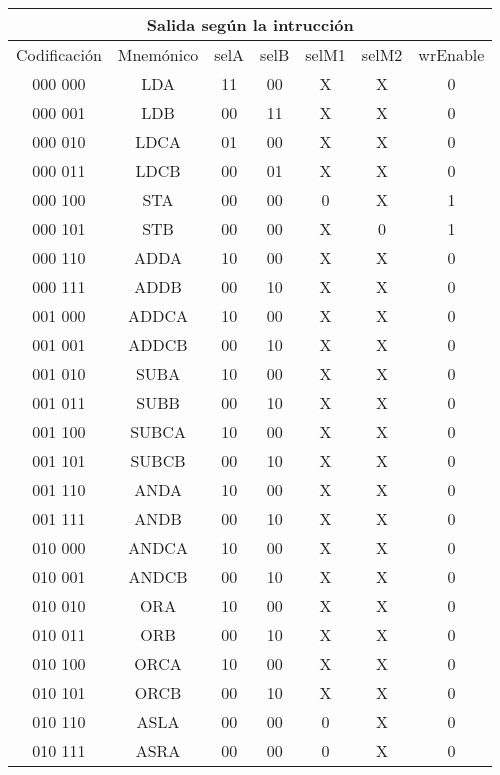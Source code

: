 \documentclass[paper=letter, fontsize=12pt]{article}
\begin{document}
\begin{table}[h]
\centering
\begin{tabular}{cc|ccccc}
\multicolumn{7}{c}{Salida según la intrucción} \\ \hline
Codificación& Mnemónico	  	& selA & selB & selM1 & selM2 & wrEnable \\ \hline
000 000 	& LDA 		  	& 11 	& 00    & X     & X     & 0 \\
000 001		& LDB  			& 00 	& 11    & X     & X     & 0 \\           
000 010 	& LDCA 			& 01 	& 00    & X     & X     & 0 \\            
000 011 	& LDCB 			& 00 	& 01    & X     & X     & 0 \\           
000 100 	& STA  	 		& 00 	& 00    & 0     & X     & 1 \\            
000 101 	& STB  			& 00 	& 00    & X     & 0     & 1 \\            
000 110 	& ADDA			& 10 	& 00    & X     & X     & 0 \\
000 111 	& ADDB			& 00 	& 10    & X     & X     & 0 \\
001 000 	& ADDCA			& 10 	& 00    & X     & X     & 0 \\
001 001 	& ADDCB			& 00 	& 10    & X     & X     & 0 \\
001 010 	& SUBA			& 10 	& 00    & X     & X     & 0 \\
001 011 	& SUBB			& 00 	& 10    & X     & X     & 0 \\
001 100 	& SUBCA			& 10 	& 00    & X     & X     & 0 \\
001 101 	& SUBCB			& 00 	& 10    & X     & X     & 0 \\
001 110 	& ANDA			& 10 	& 00    & X     & X     & 0 \\
001 111 	& ANDB			& 00 	& 10    & X     & X     & 0 \\
010 000 	& ANDCA			& 10 	& 00    & X     & X     & 0 \\
010 001 	& ANDCB			& 00 	& 10    & X     & X     & 0 \\
010 010 	& ORA			& 10 	& 00    & X     & X     & 0 \\
010 011 	& ORB			& 00 	& 10    & X     & X     & 0 \\
010 100 	& ORCA			& 10 	& 00    & X     & X     & 0 \\
010 101 	& ORCB			& 00 	& 10    & X     & X     & 0 \\
010 110 	& ASLA			& 00 	& 00    & 0     & X     & 0 \\
010 111 	& ASRA			& 00 	& 00    & 0     & X     & 0 \\
	

\end{tabular}
\end{table}
\end{document}
